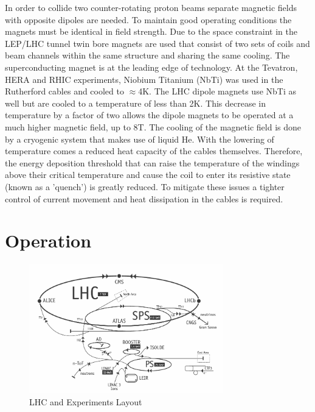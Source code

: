 In order to collide two counter-rotating proton beams separate magnetic fields
with opposite dipoles are needed. To maintain good operating conditions
the magnets must be identical in field strength. 
Due to the space constraint in the LEP/LHC
tunnel twin bore magnets are used that consist of two sets of 
coils and beam channels within the same structure and
sharing the same cooling. 
The superconducting magnet is at the leading edge of technology.
At the Tevatron, HERA and RHIC experiments, Niobium Titanium (NbTi)
was used in the Rutherford cables and cooled to $\approx$4K. 
The LHC dipole magnets use NbTi as well but are cooled
to a temperature of less than 2K. 
This decrease in temperature
by a factor of two allows the dipole magnets to be operated 
at a much higher magnetic field, up to 8T. 
The cooling of the magnetic field is done 
by a cryogenic system that makes use of liquid He. With the lowering of
temperature comes a reduced heat capacity of the cables themselves.
Therefore, the energy deposition threshold that can raise the 
temperature of the windings above their critical temperature and
cause the coil to enter its resistive state (known as a 'quench') is greatly
reduced. To mitigate these issues a tighter control of current movement
and heat dissipation in the cables is required. 
%

\section{Operation}
\begin{figure}[t]
  \centering
	\includegraphics[width=0.75\textwidth]{images/LHCLayout.png}
  	\caption[e/$\gamma$ LHC Layout]
   	{LHC and Experiments Layout}
	\label{fig:LHCRings}
\end{figure}

